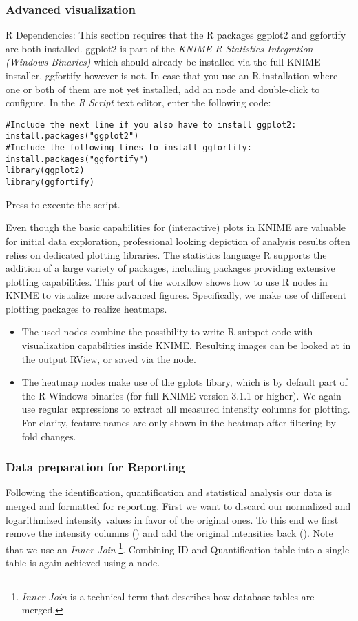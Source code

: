\subsubsection{Advanced visualization}
\label{sec:metaboR}
R Dependencies: This section requires that the R packages ggplot2 and ggfortify are both installed. ggplot2 is part of the \textit{KNIME R Statistics Integration (Windows Binaries)} which should already be installed via the full KNIME installer, ggfortify however is not.
In case that you use an R installation where one or both of them are not yet installed, add an  node and double-click to configure. In the \textit{R Script} text editor, enter the following code:
\begin{lstlisting}
#Include the next line if you also have to install ggplot2:
install.packages("ggplot2")
#Include the following lines to install ggfortify:
install.packages("ggfortify")
library(ggplot2)
library(ggfortify)
\end{lstlisting}
Press  to execute the script.\newline

Even though the basic capabilities for (interactive) plots in KNIME are valuable for initial data exploration, professional looking depiction of analysis results often relies on dedicated plotting libraries. The statistics language R supports the addition of a large variety of packages, including packages providing extensive plotting capabilities. This part of the workflow shows how to use R nodes in KNIME to visualize more advanced figures. Specifically, we make use of different plotting packages to realize heatmaps.


\begin{itemize}
\item The used  nodes combine the possibility to write R snippet code with visualization capabilities inside KNIME. Resulting images can be looked at in the output RView, or saved via the  node.
\item The heatmap nodes make use of the gplots libary, which is by default part of the R Windows binaries (for full KNIME version 3.1.1 or higher). We again use regular expressions to extract all measured intensity columns for plotting. For clarity, feature names are only shown in the heatmap after filtering by fold changes.
\end{itemize}

\subsubsection{Data preparation for Reporting}
Following the identification, quantification and statistical analysis our data is merged and formatted for reporting.
First we want to discard our normalized and logarithmized intensity values in favor of the original ones.
To this end we first remove the intensity columns () and add the original intensities back ().
Note that we use an \textit{Inner Join} \footnote{\textit{Inner Join} is a technical term that describes how database tables are merged.}.
Combining ID and Quantification table into a single table is again achieved using a  node.

